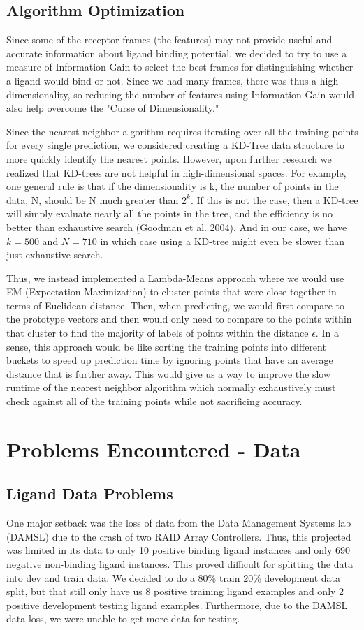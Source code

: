 \documentclass[11pt,letterpaper]{article}
\begin{document}
\subsection{Algorithm Optimization}
Since some of the receptor frames (the features) may not provide useful and accurate information about ligand binding potential, we decided to try to use a measure of Information Gain to select the best frames for distinguishing whether a ligand would bind or not.  Since we had many frames, there was thus a high dimensionality, so reducing the number of features using Information Gain would also help overcome the "Curse of Dimensionality."  

Since the nearest neighbor algorithm requires iterating over all the training points for every single prediction, we considered creating a KD-Tree data structure to more quickly identify the nearest points.  However, upon further research we realized that KD-trees are not helpful in high-dimensional spaces.  For example, one general rule is that if the dimensionality is k, the number of points in the data, N, should be N much greater than $2^k$. If this is not the case, then a KD-tree will simply evaluate nearly all the points in the tree, and the efficiency is no better than exhaustive search (Goodman et al. 2004).  And in our case, we have $k=500$ and $N=710$ in which case using a KD-tree might even be slower than just exhaustive search.

Thus, we instead implemented a Lambda-Means approach where we would use EM (Expectation Maximization) to cluster points that were close together in terms of Euclidean distance.  Then, when predicting, we would first compare to the prototype vectors and then would only need to compare to the points within that cluster to find the majority of labels of points within the distance $\epsilon$.  In a sense, this approach would be like sorting the training points into different buckets to speed up prediction time by ignoring points that have an average distance that is further away.  This would give us a way to improve the slow runtime of the nearest neighbor algorithm which normally exhaustively must check against all of the training points while not sacrificing accuracy.

\section{Problems Encountered - Data}
\subsection{Ligand Data Problems}
One major setback was the loss of data from the Data Management Systems lab (DAMSL) due to the crash of two RAID Array Controllers.  Thus, this projected was limited in its data to only 10 positive binding ligand instances and only 690 negative non-binding ligand instances.  This proved difficult for splitting the data into dev and train data.  We decided to do a 80\% train 20\% development data split, but that still only have us 8 positive training ligand examples and only 2 positive development testing ligand examples.  Furthermore, due to the DAMSL data loss, we were unable to get more data for testing.  
\end{document}
